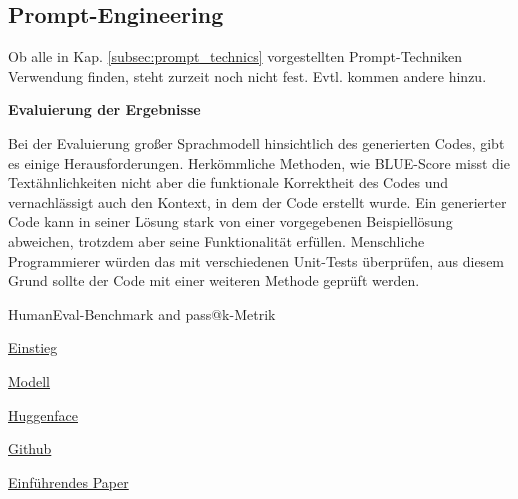 


\subsection{Prompt-Engineering}
\begin{tcolorbox}[
	enhanced,
	colback=yellow!5!white,
	colframe=yellow!75!black!50,
	title= Wird noch im Verlauf der Arbeit geändert
	]
	Ob alle in Kap. \ref{subsec:prompt_technics} vorgestellten Prompt-Techniken Verwendung finden, steht zurzeit noch nicht fest. Evtl. kommen andere hinzu.
\end{tcolorbox}

\textbf{Evaluierung der Ergebnisse}\vspace{0.2cm}

Bei der Evaluierung großer Sprachmodell hinsichtlich des generierten Codes, gibt es einige Herausforderungen. Herkömmliche Methoden, wie BLUE-Score misst die Textähnlichkeiten nicht aber die funktionale Korrektheit des Codes und vernachlässigt auch den Kontext, in dem der Code erstellt wurde. Ein generierter Code kann in seiner Lösung stark von einer vorgegebenen Beispiellösung abweichen, trotzdem aber seine Funktionalität erfüllen. Menschliche Programmierer würden das mit verschiedenen Unit-Tests überprüfen, aus diesem Grund sollte der Code mit einer weiteren Methode geprüft werden.\vspace{0.2cm}

HumanEval-Benchmark and pass@k-Metrik

\href{https://deepgram.com/learn/humaneval-llm-benchmark}{Einstieg}

\href{https://paperswithcode.com/sota/code-generation-on-humaneval}{Modell}

\href{https://huggingface.co/datasets/openai/openai_humaneval}{Huggenface}

\href{https://github.com/openai/human-eval/tree/master}{Github}

\href{https://arxiv.org/abs/2107.03374}{Einführendes Paper}



